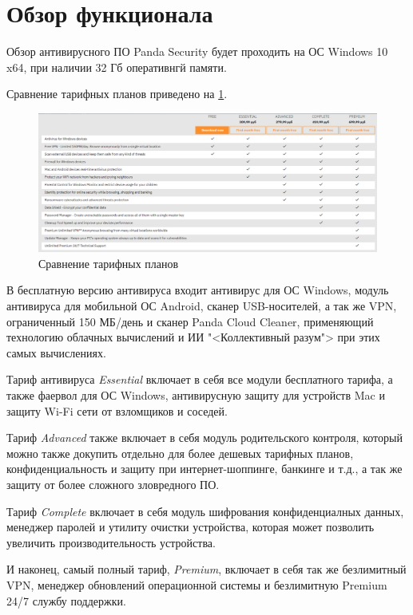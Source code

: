     \section{Обзор функционала}
        Обзор антивирусного ПО Panda Security будет проходить на ОС Windows 10 x64, при наличии 32 Гб оперативнгй памяти.\par
        Сравнение тарифных планов приведено на \ref{tariff_compare}.\par
        \begin{figure}[h]
            \centering
            \includegraphics[width=\textwidth]{pics/compare_tariffs}
            \caption{Сравнение тарифных планов}
            \label{tariff_compare}
        \end{figure}
        В бесплатную версию антивируса входит антивирус для ОС Windows, модуль антивируса для мобильной ОС
        Android, сканер USB-носителей, а так же VPN, ограниченный 150 МБ/день и сканер Panda Cloud Cleaner,
        применяющий технологию облачных вычислений и ИИ "<Коллективный разум"> при этих самых вычислениях.\par
        Тариф антивируса \emph{Essential} включает в себя все модули бесплатного тарифа, а также фаервол для 
        ОС Windows, антивирусную защиту для устройств Mac и защиту Wi-Fi сети от взломщиков и соседей.\par
        Тариф \emph{Advanced} также включает в себя
        модуль родительского контроля, который можно также докупить отдельно для более дешевых тарифных планов,
        конфиденциальность и защиту при интернет-шоппинге, банкинге и т.д., а так же защиту от более сложного
        зловредного ПО.\par
        Тариф \emph{Complete} включает в себя модуль шифрования конфиденциалных
        данных, менеджер паролей и утилиту очистки устройства, которая может позволить увеличить производительность
        устройства.\par
        И наконец, самый полный тариф, \emph{Premium}, включает в себя так же безлимитный VPN, менеджер 
        обновлений операционной системы и безлимитную Premium 24/7 службу поддержки.

